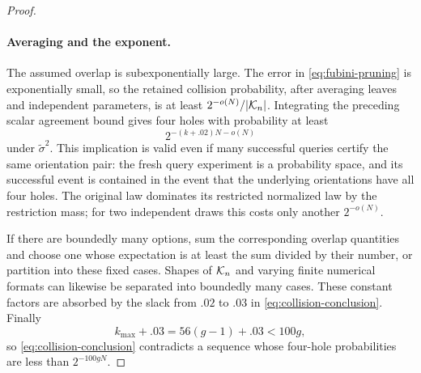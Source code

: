 \begin{proof}
\paragraph{Averaging and the exponent.}
The assumed overlap is subexponentially large.  The error
in \eqref{eq:fubini-pruning} is exponentially small, so the
retained collision probability, after averaging leaves and
independent parameters, is at least
$2^{-o(N)}/|\mathcal K_n|$.  Integrating the preceding scalar
agreement bound gives four holes with probability at least
\[
 2^{-(k+.02)N-o(N)}
\]
under $\widetilde\sigma^2$.  This implication is valid even
if many successful queries certify the same orientation
pair: the fresh query experiment is a probability space,
and its successful event is contained in the event that
the underlying orientations have all four holes.
The original law dominates its restricted normalized law
by the restriction mass; for two independent draws this
costs only another $2^{-o(N)}$.

If there are boundedly many options, sum the corresponding
overlap quantities and choose one whose expectation is at
least the sum divided by their number, or partition into
these fixed cases.  Shapes of $\mathcal K_n$ and varying finite
numerical formats can likewise be separated into boundedly
many cases.  These constant factors are absorbed by the
slack from $.02$ to $.03$ in
\eqref{eq:collision-conclusion}.  Finally
\[
 k_{\max}+.03=56(g-1)+.03<100g,
\]
so \eqref{eq:collision-conclusion} contradicts a sequence
whose four-hole probabilities are less than $2^{-100gN}$.
\end{proof}
